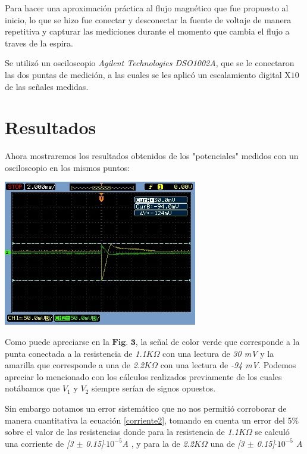 \documentclass[a0,portrait]{a0poster}
\begin{document}
\begin{multicols}{2}
\vspace{0.3cm}
Para hacer una aproximación práctica al flujo magnético que fue propuesto al inicio, lo que se hizo fue conectar y desconectar la fuente de voltaje de manera repetitiva y capturar las mediciones durante el momento que cambia el flujo a traves de la espira.

Se utilizó un osciloscopio \textit{Agilent Technologies DSO1002A}, que se le conectaron las dos puntas  de medición, a las cuales se les aplicó un escalamiento digital X$10$ de las señales medidas.
\section*{Resultados}
\noindent Ahora mostraremos los resultados obtenidos de los "potenciales" medidos con un osciloscopio en los mismos puntos:  
 
\begin{center}\vspace{0.4cm}
\includegraphics[scale=1.5]{Circuito3.jpeg}
\end{center}\vspace{0.4cm}

\noindent Como puede apreciarse en la $\textbf{Fig. 3}$, la señal de color verde que corresponde a la punta conectada a la resistencia de \textit{1.1$ K\Omega$} con una lectura de \textit{30 mV} y la amarilla que corresponde a una de \textit{2.2$K \Omega$} con una lectura de \textit{-94 mV}. Podemos apreciar lo mencionado con los cálculos realizados previamente de los cuales notábamos que $V_{1}$ y $V_{2}$ siempre serían de signos opuestos.

Sin embargo notamos un error sistemático que no nos permitió corroborar de manera cuantitativa la ecuación \ref{corriente2}, tomando en cuenta un error del 5$\%$ sobre el valor de las resistencias donde para la resistencia de \textit{1.1$K \Omega$} se calculó una corriente de \textit{[3 $\pm$ 0.15]$\cdot 10^{-5}$A }, y para la de \textit{2.2$K \Omega$} una de \textit{[3 $\pm$ 0.15]$\cdot 10^{-5}$ A}


\end{multicols}
\end{document}
